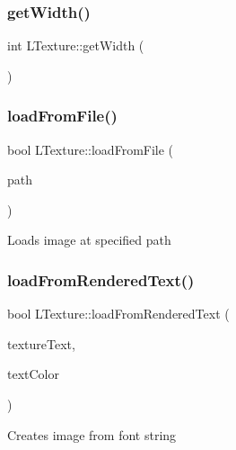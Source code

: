 \mbox{\label{class_l_texture_a542c1f81d98fd5659a04eb394d61a879}} 
\subsubsection{\texorpdfstring{get\+Width()}{getWidth()}}
{\footnotesize\ttfamily int L\+Texture\+::get\+Width (\begin{DoxyParamCaption}{ }\end{DoxyParamCaption})}

\mbox{\label{class_l_texture_ae5b2b930a619203755988c16d6403665}} 
\subsubsection{\texorpdfstring{load\+From\+File()}{loadFromFile()}}
{\footnotesize\ttfamily bool L\+Texture\+::load\+From\+File (\begin{DoxyParamCaption}\item[{std\+::string}]{path }\end{DoxyParamCaption})}

Loads image at specified path \mbox{\label{class_l_texture_af0ea348d6f108c45372fc5ec5b9296bc}} 
\subsubsection{\texorpdfstring{load\+From\+Rendered\+Text()}{loadFromRenderedText()}}
{\footnotesize\ttfamily bool L\+Texture\+::load\+From\+Rendered\+Text (\begin{DoxyParamCaption}\item[{std\+::string}]{texture\+Text,  }\item[{S\+D\+L\+\_\+\+Color}]{text\+Color }\end{DoxyParamCaption})}

Creates image from font string \mbox{\label{class_l_texture_af0d1f2a1562a976acc795f39e813fe95}} 
